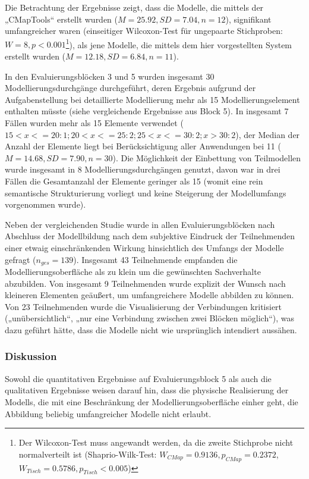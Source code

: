 Die Betrachtung der Ergebnisse zeigt, dass die Modelle, die mittels der „CMapTools“ erstellt wurden ($M=25.92, SD=7.04, n=12$), signifikant umfangreicher waren (einseitiger Wilcoxon-Test für ungepaarte Stichproben: $W=8, p<0.001$\footnote{Der Wilcoxon-Test muss angewandt werden, da die zweite Stichprobe nicht normalverteilt ist (Shaprio-Wilk-Test: $W_{CMap} = 0.9136, p_{CMap} = 0.2372$, $W_{Tisch} = 0.5786, p_{Tisch} < 0.005$)}), als jene Modelle, die mittels dem hier vorgestellten System erstellt wurden ($M=12.18, SD=6.84, n=11$).

In den Evaluierungsblöcken 3 und 5 wurden insgesamt 30 Modellierungsdurchgänge durchgeführt, deren Ergebnis aufgrund der Aufgabenstellung bei detaillierte Modellierung mehr als 15 Modellierungselement enthalten müsste (siehe vergleichende Ergebnisse aus Block 5). In insgesamt 7 Fällen wurden mehr als 15 Elemente verwendet ($15<x<=20: 1; 20<x<=25: 2; 25<x<=30: 2; x>30: 2$), der Median der Anzahl der Elemente liegt bei Berücksichtigung aller Anwendungen bei 11 ($M=14.68, SD=7.90, n=30$). Die Möglichkeit der Einbettung von Teilmodellen wurde insgesamt in 8 Modellierungsdurchgängen genutzt, davon war in drei Fällen die Gesamtanzahl der Elemente geringer als 15 (womit eine rein semantische Strukturierung vorliegt und keine Steigerung der Modellumfangs vorgenommen wurde).

Neben der vergleichenden Studie wurde in allen Evaluierungsblöcken nach Abschluss der Modellbildung nach dem subjektive Eindruck der Teilnehmenden einer etwaig einschränkenden Wirkung hinsichtlich des Umfangs der Modelle gefragt ($n_{ges}=139$). Insgesamt 43 Teilnehmende empfanden die Modellierungsoberfläche als zu klein um die gewünschten Sachverhalte abzubilden. Von insgesamt 9 Teilnehmenden wurde explizit der Wunsch nach kleineren Elementen geäußert, um umfangreichere Modelle abbilden zu können. Von 23 Teilnehmenden wurde die Visualisierung der Verbindungen kritisiert („unübersichtlich“, „nur eine Verbindung zwischen zwei Blöcken möglich“), was dazu geführt hätte, dass die Modelle nicht wie ursprünglich intendiert aussähen.

\subsubsection{Diskussion} %

Sowohl die quantitativen Ergebnisse auf Evaluierungsblock 5 als auch die qualitativen Ergebnisse weisen darauf hin, dass die physische Realisierung der Modells, die mit eine Beschränkung der Modellierungsoberfläche einher geht, die Abbildung beliebig umfangreicher Modelle nicht erlaubt.

